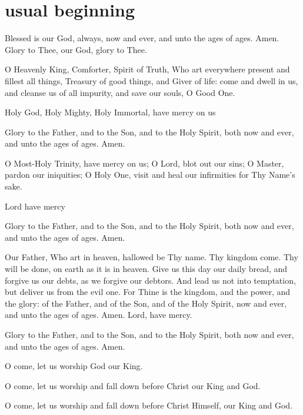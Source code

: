 \section{usual beginning}

\begin{liturgicaltext}
    \priest Blessed is our God, always, now and ever, and unto the ages of ages.
    \reader Amen. Glory to Thee, our God, glory to Thee.
    \item[] O Heavenly King, Comforter, Spirit of Truth, Who art everywhere present and fillest all things, Treasury of good things, and Giver of life: come and dwell in us, and cleanse us of all impurity, and save our souls, O Good One.
    \item[] Holy God, Holy Mighty, Holy Immortal, have mercy on us 
    \item[] Glory to the Father, and to the Son, and to the Holy Spirit, both now and ever, and unto the ages of ages. Amen.
    \item[] O Most-Holy Trinity, have mercy on us; O Lord, blot out our sins; O Master, pardon our iniquities; O Holy One, visit and heal our infirmities for Thy Name's sake.
    \item[] Lord have mercy 
    \item[] Glory to the Father, and to the Son, and to the Holy Spirit, both now and ever, and unto the ages of ages. Amen.
    \item[] Our Father, Who art in heaven, hallowed be Thy name. Thy kingdom come. Thy will be done, on earth as it is in heaven. Give us this day our daily bread, and forgive us our debts, as we forgive our debtors. And lead us not into temptation, but deliver us from the evil one.
    \priest For Thine is the kingdom, and the power, and the glory: of the Father, and of the Son, and of the Holy Spirit, now and ever, and unto the ages of ages.
    \reader Amen. Lord, have mercy. 
    \item[] Glory to the Father, and to the Son, and to the Holy Spirit, both now and ever, and unto the ages of ages. Amen.
    \item[] O come, let us worship God our King.
    \item[] O come, let us worship and fall down before Christ our King and God.
    \item[] O come, let us worship and fall down before Christ Himself, our King and God.
\end{liturgicaltext}
